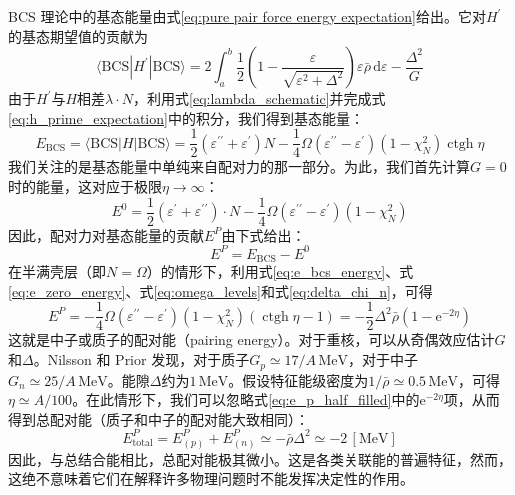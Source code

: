 BCS 理论中的基态能量由式\ref{eq:pure pair force energy expectation}给出。它对$H^{\prime}$的基态期望值的贡献为
\begin{equation}
\langle\text{BCS}|H^{\prime}|\text{BCS}\rangle=2\int^{b}_{a}\frac{1}{2}\left(1-\frac{\varepsilon}{\sqrt{\varepsilon^{2}+\Delta^{2}}}\right)\varepsilon\bar{\rho}\,\mathrm{d}\varepsilon-\frac{\Delta^{2}}{G}\label{eq:h_prime_expectation}
\end{equation}
由于$H^{\prime}$与$H$相差$\lambda\cdot N$，利用式\ref{eq:lambda_schematic}并完成式\ref{eq:h_prime_expectation}中的积分，我们得到基态能量：
\begin{equation}
E_{\text{BCS}}=\langle\text{BCS}|H|\text{BCS}\rangle=\frac{1}{2}(\varepsilon^{\prime\prime}+\varepsilon^{\prime})N-\frac{1}{4}\Omega(\varepsilon^{\prime\prime}-\varepsilon^{\prime})(1-\chi^{2}_{N})\operatorname{ctgh}\eta\label{eq:e_bcs_energy}
\end{equation}
我们关注的是基态能量中单纯来自配对力的那一部分。为此，我们首先计算$G=0$时的能量，这对应于极限$\eta\to\infty$：
\begin{equation}
E^{0}=\frac{1}{2}(\varepsilon^{\prime}+\varepsilon^{\prime\prime})\cdot N-\frac{1}{4}\Omega(\varepsilon^{\prime\prime}-\varepsilon^{\prime})(1-\chi^{2}_{N})\label{eq:e_zero_energy}
\end{equation}
因此，配对力对基态能量的贡献$E^{P}$由下式给出：
\begin{equation}
E^{P}=E_{\text{BCS}}-E^{0}\label{eq:e_p_definition}
\end{equation}
在半满壳层（即$N=\Omega$）的情形下，利用式\ref{eq:e_bcs_energy}、式\ref{eq:e_zero_energy}、式\ref{eq:omega_levels}和式\ref{eq:delta_chi_n}，可得
\begin{equation}
E^{P}=-\frac{1}{4}\Omega(\varepsilon^{\prime\prime}-\varepsilon^{\prime})(1-\chi^{2}_{N})(\operatorname{ctgh}\eta-1)=-\frac{1}{2}\Delta^{2}\bar{\rho}(1-\mathrm{e}^{-2\eta})\label{eq:e_p_half_filled}
\end{equation}
这就是中子或质子的配对能（pairing energy）。对于重核，可以从奇偶效应估计$G$和$\Delta$。Nilsson
和 Prior \cite{NP61} 发现，对于质子$G_{p}\simeq17/A\,\text{MeV}$，对于中子$G_{n}\simeq25/A\,\text{MeV}$。能隙$\Delta$约为$1\,\text{MeV}$。假设特征能级密度为$1/\bar{\rho}\simeq0.5\,\text{MeV}$，可得$\eta\simeq A/100$。在此情形下，我们可以忽略式\ref{eq:e_p_half_filled}中的$\mathrm{e}^{-2\eta}$项，从而得到总配对能（质子和中子的配对能大致相同）：
\begin{equation}
E^{P}_{\text{total}}=E^{P}_{(p)}+E^{P}_{(n)}\simeq-\bar{\rho}\Delta^{2}\simeq-2\,[\text{MeV}]\label{eq:e_total_pairing}
\end{equation}
因此，与总结合能相比，总配对能极其微小。这是各类关联能的普遍特征，然而，这绝不意味着它们在解释许多物理问题时不能发挥决定性的作用。

